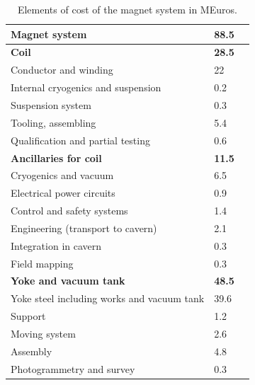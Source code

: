 
\begin{table}\hspace*{-0cm}\small 
\begin{tabular}[h!]{ l p{0.2\hsize}  p{0.1\hsize} }
\toprule
\textbf{Magnet system} & \textbf{88.5}\\
\midrule
\textbf{Coil} & \textbf{28.5}\\
\midrule
Conductor and winding & 22\\
Internal cryogenics and suspension &  0.2\\
Suspension system & 0.3 \\
Tooling, assembling & 5.4 \\
Qualification and partial testing & 0.6\\
\midrule
\textbf{Ancillaries for coil} & \textbf{11.5}\\
\midrule
Cryogenics and vacuum & 6.5\\
Electrical power circuits & 0.9\\
Control and safety systems& 1.4 \\
Engineering (transport to cavern) & 2.1\\
Integration in cavern& 0.3 \\
Field mapping&0.3\\
\midrule
\textbf{Yoke and vacuum tank} & \textbf{48.5}\\
\midrule
Yoke steel including works and vacuum tank& 39.6\\
Support &1.2\\
Moving system& 2.6\\
Assembly& 4.8\\
Photogrammetry and survey& 0.3 \\
\bottomrule
\end{tabular}
\caption{\label{magnet_cost}Elements of cost of the magnet system in MEuros.}
\end{table}



